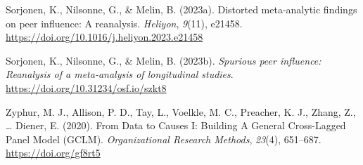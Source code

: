 \documentclass[
  man,mask,floatsintext]{apa6}
\newlength{\cslhangindent}
\newenvironment{CSLReferences}[2] %
 {\begin{list}{}{%
  \setlength{\itemindent}{0pt}
  \setlength{\leftmargin}{0pt}
  \setlength{\parsep}{0pt}
  \ifodd #1
   \setlength{\leftmargin}{\cslhangindent}
   \setlength{\itemindent}{-1\cslhangindent}
  \fi
  \setlength{\itemsep}{#2\baselineskip}}}
 {\end{list}}
\begin{document}
\begin{CSLReferences}{1}{0}
Sorjonen, K., Nilsonne, G., \& Melin, B. (2023a). Distorted meta-analytic findings on peer influence: {A} reanalysis. \emph{Heliyon}, \emph{9}(11), e21458. \url{https://doi.org/10.1016/j.heliyon.2023.e21458}

Sorjonen, K., Nilsonne, G., \& Melin, B. (2023b). \emph{Spurious peer influence: {Reanalysis} of a meta-analysis of longitudinal studies}. \url{https://doi.org/10.31234/osf.io/szkt8}

Zyphur, M. J., Allison, P. D., Tay, L., Voelkle, M. C., Preacher, K. J., Zhang, Z., \ldots{} Diener, E. (2020). From {Data} to {Causes I}: {Building A General Cross-Lagged Panel Model} ({GCLM}). \emph{Organizational Research Methods}, \emph{23}(4), 651--687. \url{https://doi.org/gf8rt5}

\end{CSLReferences}
\end{document}

